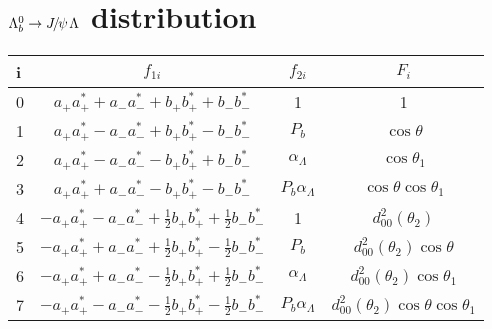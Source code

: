\section{$\Lb\ra\jpsi\Lz$ distribution}
\label{ap:LbJpsiLAngular}




\begin{table}
\begin{tabular}{lccc}
             \hline\hline
              i & $f_{1i}$
           & $f_{2i}$                & $F_{i}$
                             \\
             \hline
              0 & $a_{+}a_{+}^{*}+a_{-}a_{-}^{*}+b_{+}b_{+}^{*}+b_{-}b_{-}^{*}$
           & 1                       & 1
                                 \\
             \hline
              1 & $a_{+}a_{+}^{*}-a_{-}a_{-}^{*}+b_{+}b_{+}^{*}-b_{-}b_{-}^{*}$
           & $P_{b}$                 & $\cos\theta$
                               \\
              2 & $a_{+}a_{+}^{*}-a_{-}a_{-}^{*}-b_{+}b_{+}^{*}+b_{-}b_{-}^{*}$
           & $\alpha_{\Lambda}$      & $\cos\theta_{1}$
                               \\
              3 & $a_{+}a_{+}^{*}+a_{-}a_{-}^{*}-b_{+}b_{+}^{*}-b_{-}b_{-}^{*}$
           & $P_{b}\alpha_{\Lambda}$ & $\cos\theta\cos\theta_{1}$
                             \\
              4 & $-a_{+}a_{+}^{*}-a_{-}a_{-}^{*}+{\frac{1}{2}} b_{+}b_{+}^{*}+{\frac{1}{2}}
 b_{-}b_{-}^{*}$ & 1                       & $d_{00}^{2}(\theta_{2})$
                                       \\
              5 & $-a_{+}a_{+}^{*}+a_{-}a_{-}^{*}+{\frac{1}{2}} b_{+}b_{+}^{*}-{\frac{1}{2}}
 b_{-}b_{-}^{*}$ & $P_{b}$                 & $d_{00}^{2}(\theta_{2})\cos\theta$
                                 \\
              6 & $-a_{+}a_{+}^{*}+a_{-}a_{-}^{*}-{\frac{1}{2}} b_{+}b_{+}^{*}+{\frac{1}{2}}
 b_{-}b_{-}^{*}$ & $\alpha_{\Lambda}$      &
 $d_{00}^{2}(\theta_{2})\cos\theta_{1}$                                  \\
              7 & $-a_{+}a_{+}^{*}-a_{-}a_{-}^{*}-{\frac{1}{2}} b_{+}b_{+}^{*}-{\frac{1}{2}}
 b_{-}b_{-}^{*}$ & $P_{b}\alpha_{\Lambda}$ &
 $d_{00}^{2}(\theta_{2})\cos\theta\cos\theta_{1}$                      \\

\end{tabular}
\end{table}
